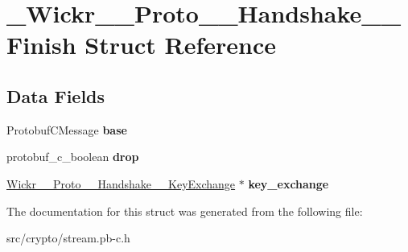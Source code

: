 \hypertarget{struct___wickr_____proto_____handshake_____finish}{}\section{\+\_\+\+Wickr\+\_\+\+\_\+\+Proto\+\_\+\+\_\+\+Handshake\+\_\+\+\_\+\+Finish Struct Reference}
\label{struct___wickr_____proto_____handshake_____finish}
\subsection*{Data Fields}
\begin{DoxyCompactItemize}
\item 
\mbox{\label{struct___wickr_____proto_____handshake_____finish_a60f003e97baa30a7759436a459af6b5a}} 
Protobuf\+C\+Message {\bfseries base}
\item 
\mbox{\label{struct___wickr_____proto_____handshake_____finish_a8fc567cc58c6349af71ea4d0bc810ecf}} 
protobuf\+\_\+c\+\_\+boolean {\bfseries drop}
\item 
\mbox{\label{struct___wickr_____proto_____handshake_____finish_a9e7738964496436460aeee10af8cb827}} 
\hyperlink{struct___wickr_____proto_____handshake_____key_exchange}{Wickr\+\_\+\+\_\+\+Proto\+\_\+\+\_\+\+Handshake\+\_\+\+\_\+\+Key\+Exchange} $\ast$ {\bfseries key\+\_\+exchange}
\end{DoxyCompactItemize}


The documentation for this struct was generated from the following file\+:\begin{DoxyCompactItemize}
\item 
src/crypto/stream.\+pb-\/c.\+h\end{DoxyCompactItemize}

